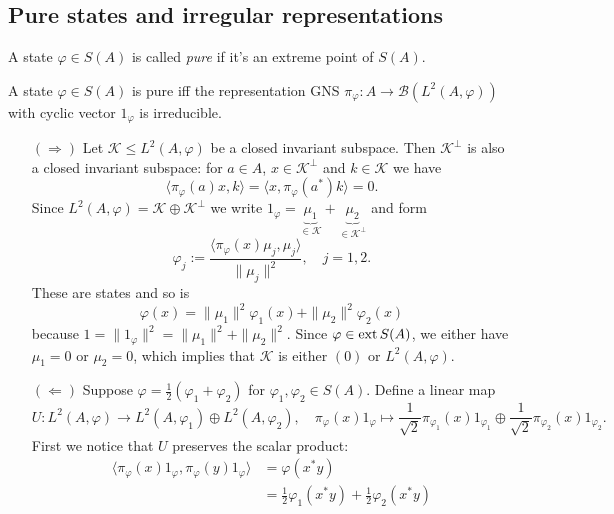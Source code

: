 \subsection{Pure states and irregular representations}

\begin{definition}
  A state $\varphi \in S(A)$ is called \emph{pure} if it's an extreme point of $S(A)$.
\end{definition}

\begin{proposition}
  A state $\varphi \in S(A)$ is pure iff the representation GNS $\pi_{\varphi}: A \to \mathcal{B} (L^2 (A, \varphi))$
  with cyclic vector $1_{\varphi}$ is irreducible.
\end{proposition}

\begin{myproof}
  \begin{itemize}
    \item[$(\Rightarrow)$] Let $\mathcal{K} \leq L^2 (A, \varphi)$ be a closed invariant subspace.
    Then $\mathcal{K}^{\perp}$ is also a closed invariant subspace: for $a \in A$, $x \in \mathcal{K}^{\perp}$ and $k \in \mathcal{K}$ we have 
    $$\langle \pi_\varphi (a) x, k\rangle = \langle x, \pi_\varphi (a^*) k \rangle = 0.$$
    Since $L^2 (A, \varphi) = \mathcal{K} \oplus \mathcal{K}^\perp$ we write $1_\varphi = \underbrace{\mu_1}_{\in \mathcal{K}} + \underbrace{\mu_2}_{\in \mathcal{K}^\perp}$
    and form 
    $$\varphi_j := \frac{\langle \pi_\varphi (x) \mu_j, \mu_j \rangle}{\| \mu_j\|^2},\quad j = 1, 2.$$
    These are states and so is 
    $$\varphi(x) = \| \mu_1 \|^2 \varphi_1 (x) + \| \mu_2 \|^2 \varphi_2 (x)$$
    because $1 = \|1_\varphi\|^2 = \| \mu_1\|^2 + \|\mu_2\|^2$. Since $\varphi \in \operatorname{ext} S(A)$, we either have 
    $\mu_1 = 0$ or $\mu_2 = 0$, which implies that $\mathcal{K}$ is either $(0)$ or $L^2 (A, \varphi)$.
    \item[$(\Leftarrow)$] Suppose $\varphi = \frac{1}{2} (\varphi_1 + \varphi_2)$ for $\varphi_1, \varphi_2 \in S(A)$.
    Define a linear map 
    $$U: L^2 (A, \varphi) \to L^2 (A, \varphi_1) \oplus L^2 (A, \varphi_2),\quad \pi_\varphi(x) 1_\varphi \mapsto \frac{1}{\sqrt{2}} \pi_{\varphi_1}(x) 1_{\varphi_1} \oplus \frac{1}{\sqrt{2}} \pi_{\varphi_2} (x) 1_{\varphi_2}.$$
    First we notice that $U$ preserves the scalar product:
    \begin{align*}
      \langle \pi_\varphi (x) 1_\varphi, \pi_\varphi (y) 1_\varphi \rangle &= \varphi (x^* y)\\
      &= \frac{1}{2} \varphi_1(x^* y) + \frac{1}{2} \varphi_2 (x^* y)\\

\end{align*}
\end{itemize}
\end{myproof}
